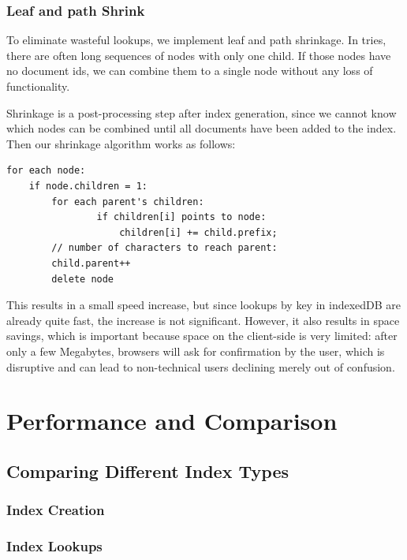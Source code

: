 \documentclass{vldb}
\begin{document}
\subsubsection{Leaf and path Shrink}

To eliminate wasteful lookups, we implement leaf and path shrinkage. In tries, there are often long sequences of nodes with only one child. If those nodes have no document ids, we can combine them to a single node without any loss of functionality.

Shrinkage is a post-processing step after index generation, since we cannot know which nodes can be combined until all documents have been added to the index. Then our shrinkage algorithm works as follows:

\begin{verbatim}
for each node: 
    if node.children = 1:
        for each parent's children:
        	    if children[i] points to node:
        	    	children[i] += child.prefix;
        // number of characters to reach parent:
        child.parent++
        delete node
\end{verbatim}

This results in a small speed increase, but since lookups by key in indexedDB are already quite fast, the increase is not significant. However, it also results in space savings, which is important because space on the client-side is very limited: after only a few Megabytes, browsers will ask for confirmation by the user, which is disruptive and can lead to non-technical users declining merely out of confusion.

\section{Performance and Comparison}

\subsection{Comparing Different Index Types}

\subsubsection{Index Creation}

\subsubsection{Index Lookups}
\end{document}
